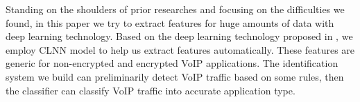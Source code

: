 \documentclass[conference]{IEEEtran}
\begin{document}



Standing on the shoulders of prior researches and focusing on the difficulties we found, in this paper we try to extract features for huge amounts of data with deep learning technology. Based on the deep learning technology proposed in \cite{1}, we employ CLNN model to help us extract features automatically. These features are generic for non-encrypted and encrypted VoIP applications. The identification system we build can preliminarily detect VoIP traffic based on some rules, then the classifier can classify VoIP traffic into accurate application type.
\end{document}
